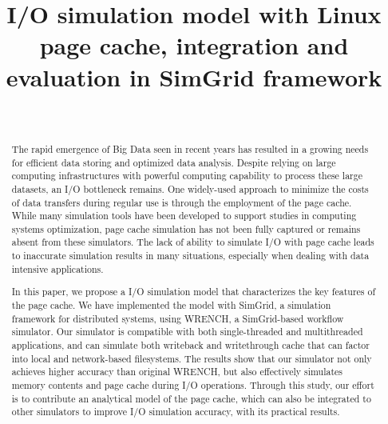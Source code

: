 \documentclass[conference]{IEEEtran}
\begin{document}
\title{I/O simulation model with Linux page cache, integration and evaluation in SimGrid framework}

\author{\\
}

\maketitle

    \begin{abstract}
        
        The rapid emergence of Big Data seen in recent years has resulted in a 
        growing needs for efficient data storing and optimized data analysis. 
        Despite relying on large computing infrastructures with powerful computing capability 
        to process these large datasets, an I/O bottleneck remains. 
        One widely-used approach to minimize the costs of data transfers during
        regular use is through the employment of the page cache.
        While many simulation tools have been developed to 
        support studies in computing systems optimization, page cache simulation 
        has not been fully captured or remains absent from these simulators. 
        The lack of ability to simulate I/O with page cache leads to inaccurate 
        simulation results in many situations, especially when dealing with data intensive applications. 
        
        In this paper, we propose a I/O simulation model that characterizes the key features of the page cache.
        We have implemented the model with SimGrid, a simulation framework for 
        distributed systems, using WRENCH, a SimGrid-based workflow simulator. 
        Our simulator is compatible with both single-threaded and multithreaded applications,
        and can simulate both writeback and writethrough cache that can factor into local
        and network-based filesystems.
        The results show that our simulator not only achieves higher accuracy than 
        original WRENCH, but also effectively simulates memory contents and 
        page cache during I/O operations. 
        Through this study, our effort is to contribute an analytical model 
        of the page cache, which can also be integrated to other simulators 
        to improve I/O simulation accuracy, with its practical results. 
        
    \end{abstract}         
\end{document}
